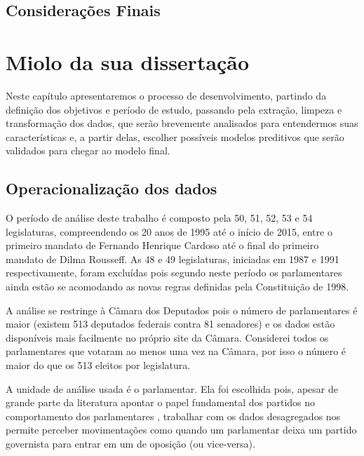 \documentclass[a4paper,titlepage]{ppgi}\usepackage[]{graphicx}\usepackage[]{color}
\begin{document}
\section{Considerações Finais}




\chapter{Miolo da sua dissertação}\label{cap:miolo}

Neste capítulo apresentaremos o processo de desenvolvimento, partindo da
definição dos objetivos e período de estudo, passando pela extração, limpeza e
transformação dos dados, que serão brevemente analisados para entendermos suas
características e, a partir delas, escolher possíveis modelos preditivos que
serão validados para chegar ao modelo final.

\section{Operacionalização dos dados}


O período de análise deste trabalho é composto pela 50\textordfeminine{},
51\textordfeminine{}, 52\textordfeminine{}, 53\textordfeminine{} e
54\textordfeminine{} legislaturas, compreendendo os 20 anos de 1995 até o
início de 2015, entre o primeiro mandato de Fernando Henrique Cardoso até o
final do primeiro mandato de Dilma Rousseff. As 48\textordfeminine{} e
49\textordfeminine{} legislaturas, iniciadas em 1987 e 1991 respectivamente,
foram excluídas pois segundo  neste período os
parlamentares ainda estão se acomodando as novas regras definidas pela
Constituição de 1998.


A análise se restringe à Câmara dos Deputados pois o número de parlamentares é
maior (existem 513 deputados federais contra 81 senadores) e os dados estão
disponíveis mais facilmente no próprio site da Câmara. Considerei todos os
parlamentares que votaram ao menos uma vez na Câmara, por isso o número é maior
do que os 513 eleitos por legislatura.

A unidade de análise usada é o parlamentar. Ela foi escolhida pois, apesar de
grande parte da literatura apontar o papel fundamental dos partidos no
comportamento dos parlamentares \cite{Figueiredo2001,Santos2003}, trabalhar com
os dados desagregados nos permite perceber movimentações como quando um
parlamentar deixa um partido governista para entrar em um de oposição (ou
vice-versa).
\end{document}

